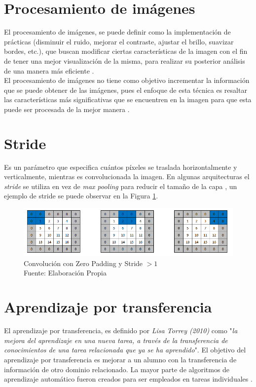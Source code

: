 \section{Procesamiento de imágenes} El procesamiento de imágenes, se puede definir como la implementación de prácticas (disminuir el ruido, mejorar el contraste, ajustar el brillo, suavizar bordes, etc.), que buscan modificar ciertas características de la imagen con el fin de tener una mejor visualización de la misma, para realizar su posterior análisis de una manera más eficiente \cite{ref_13}.\\

El procesamiento de imágenes no tiene como objetivo incrementar la información que se puede obtener de las imágenes, pues el enfoque de esta técnica es resaltar las características más significativas que se encuentren en la imagen para que esta puede ser procesada de la mejor manera \cite{ref_13}.


\section{Stride}

Es un parámetro que especifica cuántos píxeles se traslada horizontalmente y verticalmente, mientras es convolucionada la imagen. En algunas arquitecturas el \textit{stride} se utiliza en vez de \textit{max pooling} para reducir el tamaño de la capa \cite{murphy2016overview}, un ejemplo de stride se puede observar en la Figura \ref{stride}.

\begin{figure}[ht]
	\centering
	\includegraphics[scale=0.5]{Figs/stride.png}
	\caption{Convolución con Zero Padding y Stride $> 1$\\Fuente: Elaboración Propia}
	\label{stride}
\end{figure}

\section{Aprendizaje por transferencia}
El aprendizaje por transferencia, es definido por \textit{Lisa Torrey (2010)} como "\textit{la mejora del aprendizaje en una nueva tarea, a través de la transferencia de conocimientos de una tarea relacionada que ya se ha aprendido}". El objetivo del aprendizaje por transferencia es mejorar a un alumno con la transferencia de información de otro dominio relacionado. La mayor parte de algoritmos de aprendizaje automático fueron creados para ser empleados en tareas individuales \cite{ref_14}.

